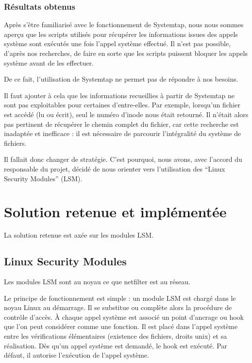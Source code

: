 \documentclass[pdftex,a4paper,titlepage,11pt]{article}
\begin{document}
\subsubsection{Résultats obtenus}

Après s'être familiarisé avec le fonctionnement de Systemtap, nous nous sommes aperçu que les scripts utilisés pour récupérer les informations issues des appels système sont exécutés une fois l'appel système effectué. Il n'est pas possible, d'après nos recherches, de faire en sorte que les scripts puissent bloquer les appels système avant de les effectuer.

De ce fait, l'utilisation de Systemtap ne permet pas de répondre à nos besoins.

Il faut ajouter à cela que les informations recueillies à partir de Systemtap ne sont pas exploitables pour certaines d'entre-elles. Par exemple, lorsqu'un fichier est accédé (lu ou écrit), seul le numéro d'inode nous était retourné. Il n'était alors pas pertinent de récupérer le chemin complet du fichier, car cette recherche est inadaptée et inefficace : il est nécessaire de parcourir l'intégralité du système de fichiers.

Il fallait donc changer de stratégie. C'est pourquoi, nous avons, avec l'accord du responsable du projet, décidé de nous orienter vers l'utilisation des ``Linux Security Modules'' (LSM).


\section{Solution retenue et implémentée}

La solution retenue est axée sur les modules LSM.

\subsection{Linux Security Modules}

Les modules LSM sont au noyau ce que netfilter est au réseau.

Le principe de fonctionnement est simple : un module LSM est chargé dans le noyau Linux au démarrage. Il se substitue ou complète alors la procédure de contrôle d'accès. \`A chaque appel système est associé un point d'ancrage ou hook que l'on peut considérer comme une fonction. Il est placé dans l'appel système entre les vérifications élémentaires (existence des fichiers, droits unix) et sa réalisation. Dès qu'un appel système est demandé, le hook est exécuté. Par défaut, il autorise l'exécution de l'appel système.
\end{document}
